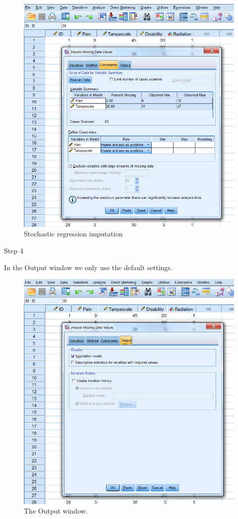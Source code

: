 \documentclass[]{book}
\theoremstyle{definition}
\theoremstyle{definition}
\theoremstyle{definition}
\theoremstyle{remark}
\begin{document}
\begin{figure}

{\centering \includegraphics[width=0.9\linewidth]{images/fig3.20} 

}

\caption{Stochastic regression imputation}\label{fig:fig3-20}
\end{figure}

Step 4

In the Output window we only use the default settings.

\begin{figure}

{\centering \includegraphics[width=0.9\linewidth]{images/fig3.21} 

}

\caption{The Output window.}\label{fig:fig3-21}
\end{figure}
\end{document}
